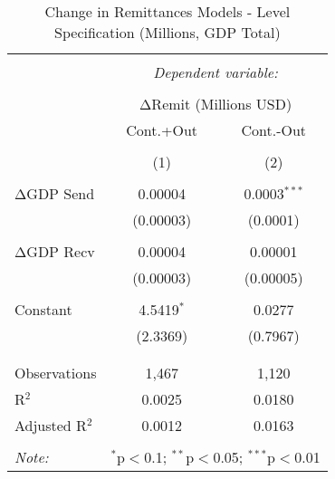 
\begin{table}[!htbp] \centering 
  \caption{Change in Remittances Models - Level Specification (Millions, GDP Total)} 
  \label{} 
\begin{tabular}{@{\extracolsep{5pt}}lcc} 
\\[-1.8ex]\hline 
\hline \\[-1.8ex] 
 & \multicolumn{2}{c}{\textit{Dependent variable:}} \\ 
\cline{2-3} 
\\[-1.8ex] & \multicolumn{2}{c}{ΔRemit (Millions USD)} \\ 
 & Cont.+Out & Cont.-Out \\ 
\\[-1.8ex] & (1) & (2)\\ 
\hline \\[-1.8ex] 
 ΔGDP Send & 0.00004 & 0.0003$^{***}$ \\ 
  & (0.00003) & (0.0001) \\ 
  & & \\ 
 ΔGDP Recv & 0.00004 & 0.00001 \\ 
  & (0.00003) & (0.00005) \\ 
  & & \\ 
 Constant & 4.5419$^{*}$ & 0.0277 \\ 
  & (2.3369) & (0.7967) \\ 
  & & \\ 
\hline \\[-1.8ex] 
Observations & 1,467 & 1,120 \\ 
R$^{2}$ & 0.0025 & 0.0180 \\ 
Adjusted R$^{2}$ & 0.0012 & 0.0163 \\ 
\hline 
\hline \\[-1.8ex] 
\textit{Note:}  & \multicolumn{2}{r}{$^{*}$p$<$0.1; $^{**}$p$<$0.05; $^{***}$p$<$0.01} \\ 
\end{tabular} 
\end{table} 
